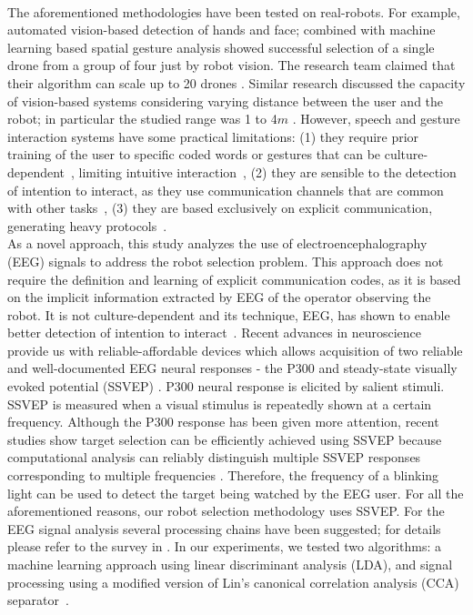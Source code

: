 \documentclass[smallextended]{svjour3}
\begin{document}
\\
The aforementioned methodologies have been tested on real-robots. For example, automated vision-based detection of hands and face; combined with machine learning based spatial gesture analysis showed successful selection of a single drone from a group of four just by robot vision. 
The research team claimed that their algorithm can scale up to 20 drones \cite{Nagietal2014}. Similar research discussed the capacity of vision-based systems considering varying distance between the user and the robot; in particular the studied range was 1 to 4$m$ \cite{Couture-Beil2010}. 
However, speech and gesture interaction systems have some practical limitations: (1) they require prior training of the user to specific coded words or gestures that can be culture-dependent~\cite{Trovato2013}, limiting intuitive interaction~\cite{Kirchner2015}, (2) they are sensible to the detection of intention to interact, as they use communication channels that are common with other tasks~\cite{Rzepecki2012}, (3) they are based exclusively on explicit communication, generating heavy protocols~\cite{Kirchner2015}.
\\ 
As a novel approach, this study analyzes the use of electroencephalography (EEG) signals to address the robot selection problem. 
This approach does not require the definition and learning of explicit communication codes, as it is based on the implicit information extracted by EEG of the operator observing the robot. 
It is not culture-dependent and its technique, EEG, has shown to enable better detection of intention to interact~\cite{Rzepecki2012}.
Recent advances in neuroscience provide us with reliable-affordable devices which allows acquisition of two reliable and well-documented EEG neural responses - the P300 and steady-state visually evoked potential (SSVEP) \cite{Beverina2003,Bi2013,Zhu2010}. 
P300 neural response is elicited by salient stimuli. SSVEP is measured when a visual stimulus is repeatedly shown at a certain frequency. Although the P300 response has been given more attention, recent studies show target selection can be efficiently achieved using SSVEP because computational analysis can reliably distinguish multiple SSVEP responses corresponding to multiple frequencies \cite{SSVEPfiability}. Therefore, the frequency of a blinking light can be used to detect the target being watched by the EEG user. 
For all the aforementioned reasons, our robot selection methodology uses SSVEP. 
For the EEG signal analysis several processing chains have been suggested; for details please refer to the survey in \cite{Bi2013}. In our experiments, we tested two algorithms: a machine learning approach using linear discriminant analysis (LDA), and signal processing using a modified version of Lin's canonical correlation analysis (CCA) separator~\cite{Lin2014}. 
\end{document}
